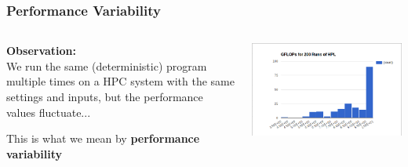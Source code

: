 \documentclass[aspectratio=169]{beamer}
\begin{document}
\begin{frame}\frametitle{Performance Variability}
	\begin{columns}
	\begin{column}{0.5\textwidth}
		\textbf{Observation:}\\
		We run the same (deterministic) program multiple times
		on a HPC system with the same settings and inputs, but
		the performance values fluctuate...\\

		\bigskip
		\medskip

		This is what we mean by \textbf{performance variability}
	\end{column}
	\begin{column}{0.5\textwidth}
		\includegraphics[width=0.42\paperwidth]{varsys.png}\\
	\end{column}
	\end{columns}
\end{frame}
\end{document}
